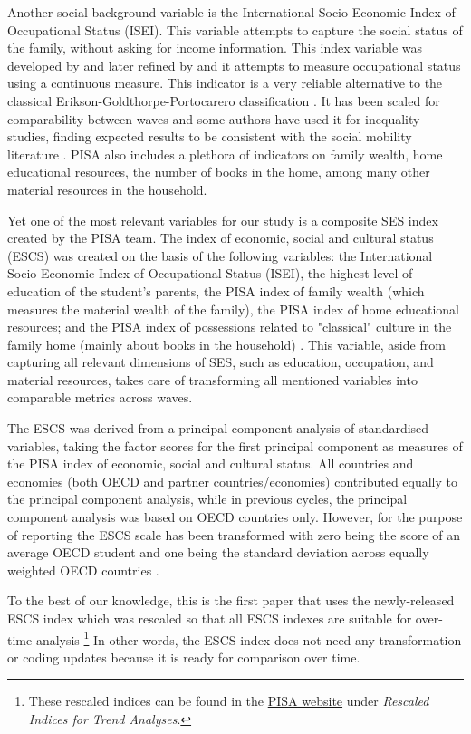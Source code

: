 \documentclass[11pt, a4paper]{article}\usepackage[]{graphicx}\usepackage[]{color}
\begin{document}
Another social background variable is the International Socio-Economic Index of Occupational Status (ISEI). This variable attempts to capture the social status of the family, without asking for income information. This index variable was developed by \citet{ganzeboom1996} and later refined by \citep{ganzeboom2010} and it attempts to measure occupational status using a continuous measure. This indicator is a very reliable alternative to the  classical Erikson-Goldthorpe-Portocarero classification \citep{erikson1979}. It has been scaled for comparability between waves and some authors have used it for inequality studies, finding expected results to be consistent with the social mobility literature \citep{anna2016_global}. PISA also includes a plethora of indicators on family wealth, home educational resources, the number of books in the home, among many other material resources in the household.

Yet one of the most relevant variables for our study is a composite SES index created by the PISA team. The index of economic, social and cultural status (ESCS) was created on the basis of the following variables: the International Socio-Economic Index of Occupational Status (ISEI), the highest level of education of the student’s parents, the PISA index of family wealth (which measures the material wealth of the family), the PISA index of home educational resources; and the PISA index of possessions related to "classical" culture in the family home (mainly about books in the household) \citep{oecd_glance_2002}. This variable, aside from capturing all relevant dimensions of SES, such as education, occupation, and material resources, takes care of transforming all mentioned variables into comparable metrics across waves. 

The ESCS was derived from a principal component analysis of standardised variables, taking the factor scores for the first principal component as measures of the PISA index of economic, social and cultural status. All countries and economies (both OECD and partner countries/economies) contributed equally to the principal component analysis, while in previous cycles, the principal component analysis was based on OECD countries only. However, for the purpose of reporting the ESCS scale has been transformed with zero being the score of an average OECD student and one being the standard deviation across equally weighted OECD countries \citep{pisa_2015_results}.

To the best of our knowledge, this is the first paper that uses the newly-released ESCS index \citep{pisa_2015_results} which was rescaled so that all ESCS indexes are suitable for over-time analysis \footnote{These rescaled indices can be found in the \href{http://www.oecd.org/pisa/data/2015database/}{PISA website} under \emph{Rescaled Indices for Trend Analyses}.} In other words, the ESCS index does not need any transformation or coding updates because it is ready for comparison over time.
\end{document}

